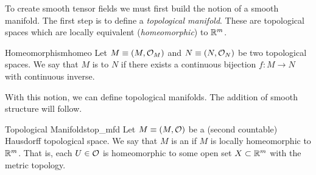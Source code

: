 

To create smooth tensor fields we must first build the notion of a smooth manifold. The first step is to define a \emph{topological manifold}.  These are topological spaces which are locally equivalent (\emph{homeomorphic}) to $\mathbb{R}^m$.  
\begin{df}{Homeomorphism}{homeo}
Let $M\equiv(M,\mathcal{O}_M)$ and $N\equiv(N,\mathcal{O}_N)$ be two topological spaces.  We say that $M$ is  to $N$ if there exists a continuous bijection $f\colon M \to N$ with continuous inverse.
\end{df}

With this notion, we can define topological manifolds.  The addition of smooth structure will follow.

\begin{df}{Topological Manifolds}{top_mfd}
Let $M\equiv(M,\mathcal{O})$ be a (second countable) Hausdorff topological space.  We say that $M$ is an  if $M$ is locally homeomorphic to $\mathbb{R}^m$. That is, each $U\in \mathcal{O}$ is homeomorphic to some open set $X\subset \mathbb{R}^m$ with the metric topology.
\end{df}

